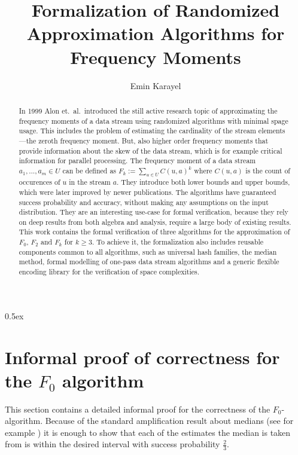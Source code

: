 \documentclass[11pt,a4paper]{article}
\begin{document}
\title{Formalization of Randomized Approximation Algorithms for Frequency Moments}
\author{Emin Karayel}
\begin{abstract}
In 1999 Alon et.\ al.\ introduced the still active research topic of approximating the frequency moments of a data stream using randomized algorithms with minimal spage usage.
This includes the problem of estimating the cardinality of the stream elements---the zeroth frequency moment.
But, also higher order frequency moments that provide information about the skew of the data stream, which is for example critical information for parallel processing.
The frequency moment of a data stream $a_1, \ldots, a_m \in U$ can be defined as $F_k := \sum_{u \in U} C(u,a)^k$ where $C(u,a)$ is the count of occurences of $u$ in the stream $a$.
They introduce both lower bounds and upper bounds, which were later improved by newer publications.
The algorithms have guaranteed success probability and accuracy, without making any assumptions on the input distribution.
They are an interesting use-case for formal verification, because they rely on deep results from both algebra and analysis, require a large body of existing results.
This work contains the formal verification of three algorithms for the approximation of $F_0$, $F_2$ and $F_k$ for $k \geq 3$.
To achieve it, the formalization also includes reusable components common to all algorithms, such as universal hash families, the median method, formal modelling of one-pass data stream algorithms and a generic flexible encoding library for the verification of space complexities.
\end{abstract}

\maketitle

\tableofcontents

\parindent 0pt\parskip 0.5ex


\appendix
\section{Informal proof of correctness for the $F_0$ algorithm\label{sec:f0_proof}}
This section contains a detailed informal proof for the correctness of the $F_0$-algorithm.
Because of the standard amplification result about medians (see for example \cite{alon1999}) it
is enough to show that each of the estimates the median is taken from is within the desired interval
with success probability $\frac{2}{3}$.
\end{document}

